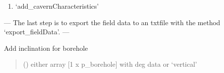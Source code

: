 \documentclass[letterpaper,10pt,english]{sphinxmanual}
\begin{document}
\begin{fulllineitems}
\begin{description}
\begin{enumerate}
\item {} 
\sphinxAtStartPar
‘add\_cavernCharacteristics’

\end{enumerate}

\end{description}

\sphinxAtStartPar
—\sphinxhyphen{} The last step is to export the field data to an txt\sphinxhyphen{}file with the method ‘export\_fieldData’. —\sphinxhyphen{}

\begin{fulllineitems}
\label{\detokenize{tscw_module:tscw_module.tscw_DataClassesInput.GacaFieldData.add_boreholeInclination}}
\pysigstartsignatures
{}
\pysigstopsignatures
\sphinxAtStartPar
Add inclination for borehole
\begin{quote}\begin{description}
\sphinxAtStartPar
{} (\sphinxstyleliteralemphasis{\sphinxupquote{ {[}}}\sphinxstyleliteralemphasis{\sphinxupquote{{]} }}) \textendash{} either array {[}1 x p\_borehole{]} with deg data or ‘vertical’

\end{description}\end{quote}

\end{fulllineitems}



\end{fulllineitems}
\end{document}
